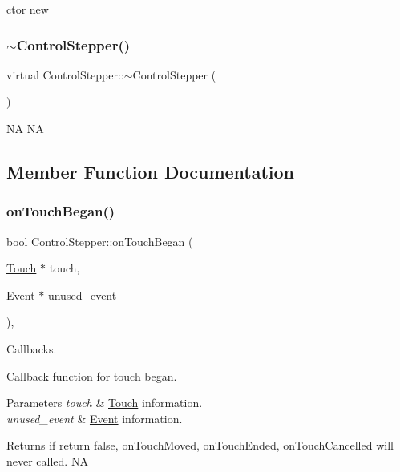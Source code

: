 ctor  new \mbox{\label{classControlStepper_abdd74d9591ddb2a154a395a81b98b031}} 
\subsubsection{\texorpdfstring{$\sim$\+Control\+Stepper()}{~ControlStepper()}\hspace{0.1cm}{\footnotesize\ttfamily [2/2]}}
{\footnotesize\ttfamily virtual Control\+Stepper\+::$\sim$\+Control\+Stepper (\begin{DoxyParamCaption}{ }\end{DoxyParamCaption})\hspace{0.3cm}{\ttfamily [virtual]}}

NA  NA 

\subsection{Member Function Documentation}
\mbox{\label{classControlStepper_a73a5572d0e9ba2a72da9f42884e621e7}} 
\subsubsection{\texorpdfstring{on\+Touch\+Began()}{onTouchBegan()}\hspace{0.1cm}{\footnotesize\ttfamily [1/2]}}
{\footnotesize\ttfamily bool Control\+Stepper\+::on\+Touch\+Began (\begin{DoxyParamCaption}\item[{\hyperlink{classTouch}{Touch} $\ast$}]{touch,  }\item[{\hyperlink{classEvent}{Event} $\ast$}]{unused\+\_\+event }\end{DoxyParamCaption})\hspace{0.3cm}{\ttfamily [override]}, {\ttfamily [virtual]}}



Callbacks. 

Callback function for touch began.


\begin{DoxyParams}{Parameters}
{\em touch} & \hyperlink{classTouch}{Touch} information. \\
\hline
{\em unused\+\_\+event} & \hyperlink{classEvent}{Event} information. \\
\hline
\end{DoxyParams}
\begin{DoxyReturn}{Returns}
if return false, on\+Touch\+Moved, on\+Touch\+Ended, on\+Touch\+Cancelled will never called.  NA 
\end{DoxyReturn}



